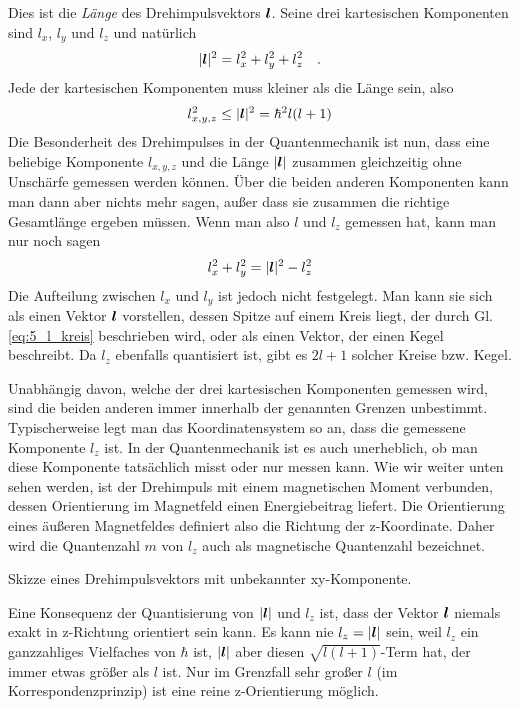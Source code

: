 Dies ist die \emph{Länge} des Drehimpulsvektors $\boldsymbol{l}$. Seine drei kartesischen Komponenten sind $l_x$, $l_y$ und $l_z$ und natürlich
\begin{equation}
    |\boldsymbol{l}|^2 =l_x^2 + l_y^2+ l_z^2 \quad .
\end{equation} 
Jede der kartesischen Komponenten muss kleiner als die Länge sein, also 
\begin{equation}
    l_{x,y,z}^2 \le |\boldsymbol{l}|^2 = \hbar^2 l (l+1)
\end{equation}
Die Besonderheit des Drehimpulses in der Quantenmechanik ist nun, dass eine beliebige Komponente $l_{x,y,z}$ und die Länge 
$|\boldsymbol{l}|$ zusammen gleichzeitig ohne Unschärfe gemessen werden können. Über die beiden anderen Komponenten kann man dann aber nichts mehr sagen, außer dass sie zusammen die richtige Gesamtlänge ergeben müssen. Wenn man also $l$ und $l_z$ gemessen hat, kann man nur noch sagen
\begin{equation}
    l_x^2 + l_y^2 = |\boldsymbol{l}|^2  - l_z^2 \label{eq:5_l_kreis}
\end{equation}
Die Aufteilung zwischen $l_x$ und $l_y$ ist jedoch nicht festgelegt. Man kann sie sich als einen Vektor $\boldsymbol{l}$ vorstellen, dessen Spitze auf einem Kreis liegt, der durch Gl.  \ref{eq:5_l_kreis} beschrieben wird, oder als einen Vektor, der einen Kegel beschreibt. Da $l_z$ ebenfalls quantisiert ist, gibt es $2l+1$ solcher Kreise bzw. Kegel.

Unabhängig davon, welche der drei kartesischen Komponenten gemessen wird, sind die beiden anderen immer innerhalb der genannten Grenzen unbestimmt. Typischerweise legt man das Koordinatensystem so an, dass die gemessene Komponente $l_z$ ist. In der Quantenmechanik ist es auch unerheblich, ob man diese Komponente tatsächlich misst oder nur messen kann. Wie wir weiter unten sehen werden, ist der Drehimpuls mit einem magnetischen Moment verbunden, dessen Orientierung im Magnetfeld einen Energiebeitrag liefert. Die Orientierung eines äußeren Magnetfeldes definiert also die Richtung der z-Koordinate. Daher wird die Quantenzahl $m$ von $l_z$ auch als magnetische Quantenzahl bezeichnet.


\begin{marginfigure}
    \caption{Skizze eines Drehimpulsvektors mit unbekannter xy-Komponente.}
\end{marginfigure}
    


Eine Konsequenz der Quantisierung von $|\boldsymbol{l}|$ und $l_z$ ist, dass der Vektor $\boldsymbol{l}$ niemals exakt in z-Richtung orientiert sein kann. Es kann nie $l_z = |\boldsymbol{l}|$ sein, weil $l_z$ ein ganzzahliges Vielfaches von $\hbar$ ist, $|\boldsymbol{l}|$ aber diesen $\sqrt{l(l+1)}$-Term hat, der immer etwas größer als $l$ ist. Nur im Grenzfall sehr großer $l$ (im Korrespondenzprinzip) ist eine reine z-Orientierung möglich.

